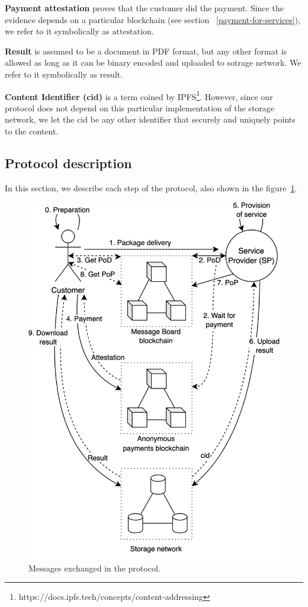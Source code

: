 \documentclass{ieeeaccess}
\begin{document}
\noindent \textbf
{Payment attestation}\label{payment-attestation} proves that the customer did the payment. Since the evidence depends on a particular blockchain (see section ~\ref{payment-for-services}), we refer to it symbolically as
\(\mathrm{attestation}\).

\noindent \textbf
{Result}\label{results} is assumed to be a document in PDF format, but any other format is allowed as long as it can be binary encoded and uploaded to sotrage network. We refer to it symbolically as $\mathrm{result}$.

\noindent \textbf
{Content Identifier (cid)}\label{content-identifier-cid} is a term coined by IPFS\footnote{https://docs.ipfs.tech/concepts/content-addressing}. However, since our protocol does not depend on
this particular implementation of the storage network, we let the $\mathrm{cid}$ be any other identifier that securely and uniquely points to the content.

\subsection{Protocol description}\label{protocol-description}

In this section, we describe each step of the protocol, also shown in the figure~\ref{fig:protocol-diagram}.

\begin{figure}[h!]
\includegraphics[width=\linewidth]{anonser-protocol.png}
\centering
\caption{Messages exchanged in the protocol.}
\label{fig:protocol-diagram}
\end{figure}
\end{document}

